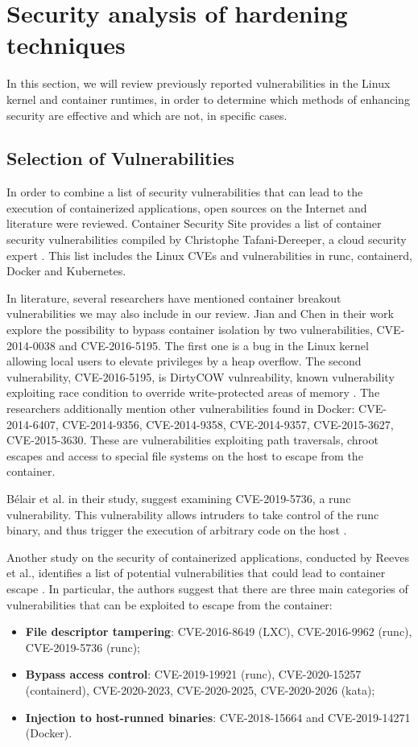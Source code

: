 \section{Security analysis of hardening techniques}

In this section, we will review previously reported vulnerabilities in the Linux kernel and container runtimes, in order to determine which methods of enhancing security are effective and which are not, in specific cases.

\subsection{Selection of Vulnerabilities}
In order to combine a list of security vulnerabilities that can lead to the execution of containerized applications, open sources on the Internet and literature were reviewed. Container Security Site provides a list of container security vulnerabilities compiled by Christophe Tafani-Dereeper, a cloud security expert \cite{s:christoph1}. This list includes the Linux CVEs and vulnerabilities in runc, containerd, Docker and Kubernetes. 

In literature, several researchers have mentioned container breakout vulnerabilities we may also include in our review. Jian and Chen in their work explore the possibility to bypass container isolation by two vulnerabilities, CVE-2014-0038 and CVE-2016-5195. The first one is a bug in the Linux kernel allowing local users to elevate privileges by a heap overflow. The second vulnerability, CVE-2016-5195, is DirtyCOW vulnreability, known vulnerability exploiting race condition to override write-protected areas of memory \cite{acm:5}. The researchers additionally mention other vulnerabilities found in Docker: CVE-2014-6407, CVE-2014-9356, CVE-2014-9358, CVE-2014-9357, CVE-2015-3627, CVE-2015-3630. These are vulnerabilities exploiting path traversals, chroot escapes and access to special file systems on
the host to escape from the container. 

Bélair et al. in their study, suggest examining CVE-2019-5736, a runc vulnerability. This vulnerability allows intruders to take control of the runc binary, and thus trigger the execution of arbitrary code on the host \cite{acm:6}.

Another study on the security of containerized applications, conducted by Reeves et al., identifies a list of potential vulnerabilities that could lead to container escape \cite{c:19}. In particular, the authors suggest that there are three main categories of vulnerabilities that can be exploited to escape from the container:
\begin{itemize}
    \item \textbf{File descriptor tampering}: CVE-2016-8649 (LXC), CVE-2016-9962 (runc), CVE-2019-5736 (runc);
    \item \textbf{Bypass access control}: CVE-2019-19921 (runc), CVE-2020-15257 (containerd), CVE-2020-2023, CVE-2020-2025, CVE-2020-2026 (kata);
    \item \textbf{Injection to host-runned binaries}: CVE-2018-15664 and CVE-2019-14271 (Docker).
\end{itemize}

